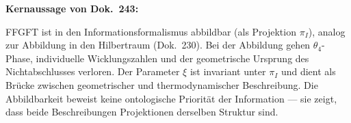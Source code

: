 \begin{keyresult}
  \textbf{Kernaussage von Dok.~243:}

  FFGFT ist in den Informationsformalismus abbildbar (als Projektion
  $\pi_I$), analog zur Abbildung in den Hilbertraum (Dok.~230).
  Bei der Abbildung gehen $\theta_4$-Phase, individuelle
  Wicklungszahlen und der geometrische Ursprung des Nichtabschlusses
  verloren. Der Parameter $\xi$ ist invariant unter $\pi_I$ und
  dient als Brücke zwischen geometrischer und thermodynamischer
  Beschreibung. Die Abbildbarkeit beweist keine ontologische
  Priorität der Information --- sie zeigt, dass beide Beschreibungen
  Projektionen derselben Struktur sind.
\end{keyresult}
